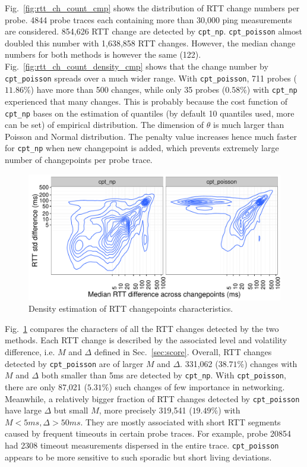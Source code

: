 Fig.~\ref{fig:rtt_ch_count_cmp} shows the distribution of RTT change numbers per probe. 4844 probe traces each containing more than 30,000 ping measurements are considered. 
854,626 RTT change are detected by \texttt{cpt\_np}.
\texttt{cpt\_poisson} almost doubled this number with 1,638,858 RTT changes.
However, the median change numbers for both methods is however the same (122).
Fig.~\ref{fig:rtt_ch_count_density_cmp} shows that the change number by \texttt{cpt\_poisson} spreads over a much wider range.
With \texttt{cpt\_poisson}, 711 probes ($11.86\%$) have more than 500 changes, while only 35 probes ($0.58\%$) with \texttt{cpt\_np} experienced that many changes.
This is probably because the cost function of \texttt{cpt\_np} bases on the estimation of quantiles (by default 10 quantiles used, more can be set) of empirical distribution. The dimension of $\theta$ is much larger than Poisson and Normal distribution. The penalty value increases hence much faster for \texttt{cpt\_np} when new changepoint is added, which prevents extremely large number of changepoints per probe trace.

\begin{figure}[!thb]
\centering
\includegraphics[width=.96\textwidth]{gfx/chap4/rtt_ch_chara_cmp.pdf}
\caption{Density estimation of RTT changepoints characteristics.}
\label{fig:rtt_chara_cmp}
\end{figure}
Fig.~\ref{fig:rtt_chara_cmp} compares the characters of all the RTT changes detected by the two methods.
Each RTT change is described by the associated level and volatility difference, i.e. $M$ and $\Delta$ defined in Sec.~\ref{sec:score}. 
Overall, RTT changes detected by \texttt{cpt\_poisson} are of larger $M$ and $\Delta$.
331,062 ($38.71\%$) changes with $M$ and $\Delta$ both smaller than 5ms are detected by \texttt{cpt\_np}.
With \texttt{cpt\_poisson}, there are only 87,021 ($5.31\%$) such changes of few importance in networking.
Meanwhile, a relatively bigger fraction of RTT changes detected by \texttt{cpt\_poisson} have large $\Delta$ but small $M$, more precisely 319,541 ($19.49\%$) with $M<5ms, \Delta>50ms$.
They are mostly associated with short RTT segments caused by frequent timeouts in certain probe traces. For example, probe 20854 had 2308 timeout measurements dispersed in the entire trace.
\texttt{cpt\_poisson} appears to be more sensitive to such sporadic but short living deviations.

